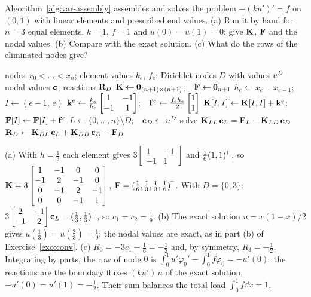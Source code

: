\label{exo:assembly}
%
Algorithm~\ref{alg:var-assembly} assembles and solves the problem
$-(ku')'=f$ on $(0,1)$ with linear elements and prescribed end values.
(a) Run it by hand for $n=3$ equal elements, $k=1$, $f=1$ and
$u(0)=u(1)=0$: give $\mathbf{K}$, $\mathbf{F}$ and the nodal values. (b) Compare with
the exact solution. (c) What do the rows of the eliminated nodes give?
\begin{algorithm}[H]
\caption{Assembly and solution, linear elements in one dimension}\label{alg:var-assembly}
\begin{algorithmic}[1]
\Require nodes $x_0<\dots<x_n$; element values $k_e$, $f_e$; Dirichlet nodes $D$ with values $u^{D}$
\Ensure nodal values $\mathbf{c}$; reactions $\mathbf{R}_D$
\State $\mathbf{K}\gets\mathbf{0}_{(n+1)\times(n+1)}$;\ \ $\mathbf{F}\gets\mathbf{0}_{n+1}$
 
  \State $h_e\gets x_e-x_{e-1}$;\ \ $I\gets(e-1,\,e)$ 
  \State $\mathbf{k}^e\gets\frac{k_e}{h_e}\begin{bmatrix}1&-1\\-1&1\end{bmatrix}$;\ \ $\mathbf{f}^e\gets\frac{f_eh_e}{2}\begin{bmatrix}1\\1\end{bmatrix}$
  \State $\mathbf{K}[I,I]\gets\mathbf{K}[I,I]+\mathbf{k}^e$;\ \ $\mathbf{F}[I]\gets\mathbf{F}[I]+\mathbf{f}^e$ 
\EndFor
\State $L\gets\{0,\dots,n\}\setminus D$;\ \ $\mathbf{c}_D\gets u^{D}$
\State solve $\mathbf{K}_{LL}\,\mathbf{c}_L=\mathbf{F}_L-\mathbf{K}_{LD}\,\mathbf{c}_D$
\State $\mathbf{R}_D\gets\mathbf{K}_{DL}\,\mathbf{c}_L+\mathbf{K}_{DD}\,\mathbf{c}_D-\mathbf{F}_D$ 
\end{algorithmic}
\end{algorithm}
\begin{solution}
(a) With $h=\tfrac13$ each element gives $3\begin{bmatrix}1&-1\\-1&1\end{bmatrix}$
and $\tfrac16(1,1)^{\!\top}$, so
$\mathbf{K}=3\begin{bmatrix}1&-1&0&0\\-1&2&-1&0\\0&-1&2&-1\\0&0&-1&1\end{bmatrix}$,
$\mathbf{F}=(\tfrac16,\tfrac13,\tfrac13,\tfrac16)^{\!\top}$. With $D=\{0,3\}$:
$3\begin{bmatrix}2&-1\\-1&2\end{bmatrix}\mathbf{c}_L=(\tfrac13,\tfrac13)^{\!\top}$, so
$c_1=c_2=\tfrac19$. (b) The exact solution $u=x(1-x)/2$ gives
$u(\tfrac13)=u(\tfrac23)=\tfrac19$: the nodal values are exact, as in part (b)
of Exercise~\ref{exo:conv}. (c) $R_0=-3c_1-\tfrac16=-\tfrac12$ and, by
symmetry, $R_3=-\tfrac12$. Integrating by parts, the row of node $0$ is
$\displaystyle \int_0^1u'\varphi_0'-\int_0^1f\varphi_0=-u'(0)$: the reactions are the boundary
fluxes $(ku')\,n$ of the exact solution, $-u'(0)=u'(1)=-\tfrac12$. Their sum
balances the total load $\displaystyle \int_0^1f\dd x=1$.
\end{solution}

